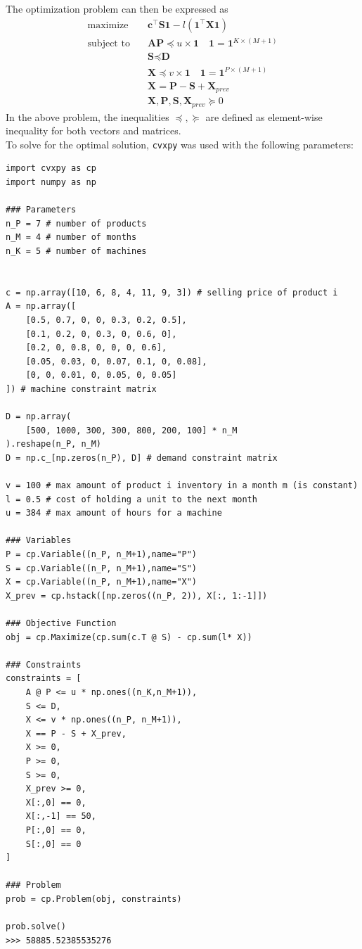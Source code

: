 \documentclass[11pt]{article}
\begin{document}
The optimization problem can then be expressed as
\begin{align*}
  \text{maximize} & \quad \textbf{c}^\top \textbf{S} \textbf{1} - l(\textbf{1}^\top \textbf{X} \textbf{1}) \\
  \text{subject to} & \quad \textbf{A} \textbf{P} \preceq u \times \textbf{1} \quad \textbf{1} = \textbf{1}^{K \times (M+1)}\\
  & \quad \textbf{S} \preceq \textbf{D} \\
  & \quad \textbf{X} \preceq v \times \textbf{1} \quad \textbf{1} = \textbf{1}^{P \times (M+1)}\\
  & \quad \textbf{X} = \textbf{P} - \textbf{S} + \textbf{X}_{prev} \\
  & \quad \textbf{X}, \textbf{P}, \textbf{S}, \textbf{X}_{prev} \succeq 0
\end{align*}
In the above problem, the inequalities $\preceq, \succeq$ are defined as element-wise inequality for both vectors and matrices.
\\ 
To solve for the optimal solution, \texttt{cvxpy} was used with the following parameters:

\begin{shaded}
\begin{verbatim}
import cvxpy as cp
import numpy as np

### Parameters
n_P = 7 # number of products
n_M = 4 # number of months
n_K = 5 # number of machines


c = np.array([10, 6, 8, 4, 11, 9, 3]) # selling price of product i
A = np.array([
    [0.5, 0.7, 0, 0, 0.3, 0.2, 0.5],
    [0.1, 0.2, 0, 0.3, 0, 0.6, 0],
    [0.2, 0, 0.8, 0, 0, 0, 0.6],
    [0.05, 0.03, 0, 0.07, 0.1, 0, 0.08],
    [0, 0, 0.01, 0, 0.05, 0, 0.05]
]) # machine constraint matrix

D = np.array(
    [500, 1000, 300, 300, 800, 200, 100] * n_M
).reshape(n_P, n_M)
D = np.c_[np.zeros(n_P), D] # demand constraint matrix

v = 100 # max amount of product i inventory in a month m (is constant)
l = 0.5 # cost of holding a unit to the next month
u = 384 # max amount of hours for a machine

### Variables
P = cp.Variable((n_P, n_M+1),name="P")
S = cp.Variable((n_P, n_M+1),name="S")
X = cp.Variable((n_P, n_M+1),name="X")
X_prev = cp.hstack([np.zeros((n_P, 2)), X[:, 1:-1]])

### Objective Function
obj = cp.Maximize(cp.sum(c.T @ S) - cp.sum(l* X))

### Constraints
constraints = [
    A @ P <= u * np.ones((n_K,n_M+1)),
    S <= D,
    X <= v * np.ones((n_P, n_M+1)),
    X == P - S + X_prev,
    X >= 0,
    P >= 0,
    S >= 0,
    X_prev >= 0,
    X[:,0] == 0,
    X[:,-1] == 50,
    P[:,0] == 0,
    S[:,0] == 0
]

### Problem
prob = cp.Problem(obj, constraints)

prob.solve()
>>> 58885.52385535276
\end{verbatim}
\end{shaded}
\end{document}
